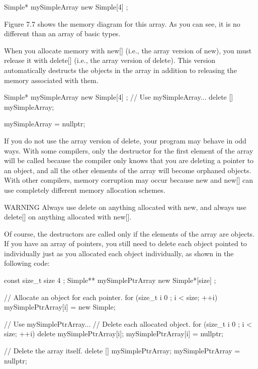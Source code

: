 \begin{cpp}
Simple* mySimpleArray { new Simple[4] };
\end{cpp}

Figure 7.7 shows the memory diagram for this array. As you can see, it is no different than an array of basic types.



When you allocate memory with new[] (i.e., the array version of new), you must release it with delete[] (i.e., the array version of delete). This version automatically destructs the objects in the array in addition to releasing the memory associated with them.

\begin{cpp}
Simple* mySimpleArray { new Simple[4] };
// Use mySimpleArray...
delete [] mySimpleArray;

mySimpleArray = nullptr;
\end{cpp}

If you do not use the array version of delete, your program may behave in odd ways. With some compilers, only the destructor for the first element of the array will be called because the compiler only knows that you are deleting a pointer to an object, and all the other elements of the array will become orphaned objects. With other compilers, memory corruption may occur because new and new[] can use completely different memory allocation schemes.

\begin{myWarning}{WARNING}
Always use delete on anything allocated with new, and always use delete[] on anything allocated with new[].
\end{myWarning}

Of course, the destructors are called only if the elements of the array are objects. If you have an array of pointers, you still need to delete each object pointed to individually just as you allocated each object individually, as shown in the following code:

\begin{cpp}
const size_t size { 4 };
Simple** mySimplePtrArray { new Simple*[size] };

// Allocate an object for each pointer.
for (size_t i { 0 }; i < size; ++i) { mySimplePtrArray[i] = new Simple{}; }

// Use mySimplePtrArray...
// Delete each allocated object.
for (size_t i { 0 }; i < size; ++i) {
    delete mySimplePtrArray[i];
    mySimplePtrArray[i] = nullptr;
}

// Delete the array itself.
delete [] mySimplePtrArray;
mySimplePtrArray = nullptr;
\end{cpp}

